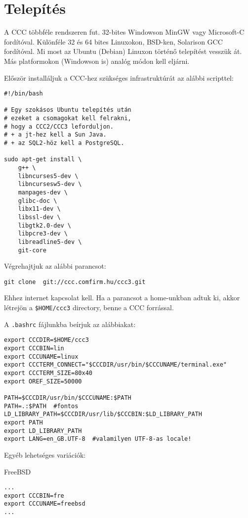 
\section{Telepítés}\label{INSTALL}

A CCC többféle rendszeren fut. 
32-bites Windowson MinGW vagy Microsoft-C fordítóval.
Különféle 32 és 64 bites Linuxokon, BSD-ken, Solarison GCC fordítóval.
Mi most az Ubuntu (Debian) Linuxon történő telepítést vesszük át.
Más platformokon (Windowson is) analóg módon kell eljárni.

Először  installáljuk a CCC-hez szükséges infrastruktúrát
az alábbi scripttel:

\begin{verbatim}
#!/bin/bash

# Egy szokásos Ubuntu telepítés után
# ezeket a csomagokat kell felrakni,
# hogy a CCC2/CCC3 leforduljon.
# + a jt-hez kell a Sun Java.
# + az SQL2-höz kell a PostgreSQL.

sudo apt-get install \
    g++ \
    libncurses5-dev \
    libncursesw5-dev \
    manpages-dev \
    glibc-doc \
    libx11-dev \
    libssl-dev \
    libgtk2.0-dev \
    libpcre3-dev \
    libreadline5-dev \
    git-core
\end{verbatim}

Végrehajtjuk az alábbi parancsot:
\begin{verbatim}
git clone  git://ccc.comfirm.hu/ccc3.git
\end{verbatim}
Ehhez internet kapcsolat kell. Ha a parancsot a home-unkban adtuk ki, 
akkor létrejön a \verb!$HOME/ccc3! directory, benne a CCC forrással.

A \verb!.bashrc! fájlunkba beírjuk az alábbiakat:

\begin{verbatim}
export CCCDIR=$HOME/ccc3
export CCCBIN=lin
export CCCUNAME=linux
export CCCTERM_CONNECT="$CCCDIR/usr/bin/$CCCUNAME/terminal.exe"
export CCCTERM_SIZE=80x40
export OREF_SIZE=50000

PATH=$CCCDIR/usr/bin/$CCCUNAME:$PATH
PATH=.:$PATH  #fontos
LD_LIBRARY_PATH=$CCCDIR/usr/lib/$CCCBIN:$LD_LIBRARY_PATH
export PATH 
export LD_LIBRARY_PATH
export LANG=en_GB.UTF-8  #valamilyen UTF-8-as locale!
\end{verbatim}

Egyéb lehetséges variációk:

FreeBSD
\begin{verbatim}
...
export CCCBIN=fre
export CCCUNAME=freebsd
...
\end{verbatim}


